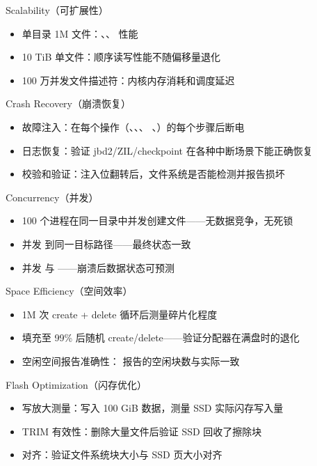 \begin{filesystemlayout}
\begin{rubricbox}{Scalability（可扩展性）}
\begin{itemize}\tightlist
\item 单目录 1M 文件：、、 性能
\item 10 TiB 单文件：顺序读写性能不随偏移量退化
\item 100 万并发文件描述符：内核内存消耗和调度延迟
\end{itemize}
\end{rubricbox}

\begin{rubricbox}{Crash Recovery（崩溃恢复）}
\begin{itemize}\tightlist
\item 故障注入：在每个操作（、、、
      、）的每个步骤后断电
\item 日志恢复：验证 jbd2/ZIL/checkpoint 在各种中断场景下能正确恢复
\item 校验和验证：注入位翻转后，文件系统是否能检测并报告损坏
\end{itemize}
\end{rubricbox}

\begin{rubricbox}{Concurrency（并发）}
\begin{itemize}\tightlist
\item 100 个进程在同一目录中并发创建文件——无数据竞争，无死锁
\item 并发  到同一目标路径——最终状态一致
\item 并发  与 ——崩溃后数据状态可预测
\end{itemize}
\end{rubricbox}

\begin{rubricbox}{Space Efficiency（空间效率）}
\begin{itemize}\tightlist
\item 1M 次 create + delete 循环后测量碎片化程度
\item 填充至 99\% 后随机 create/delete——验证分配器在满盘时的退化
\item 空闲空间报告准确性： 报告的空闲块数与实际一致
\end{itemize}
\end{rubricbox}

\begin{rubricbox}{Flash Optimization（闪存优化）}
\begin{itemize}\tightlist
\item 写放大测量：写入 100 GiB 数据，测量 SSD 实际闪存写入量
\item TRIM 有效性：删除大量文件后验证 SSD 回收了擦除块
\item 对齐：验证文件系统块大小与 SSD 页大小对齐
\end{itemize}
\end{rubricbox}


\end{filesystemlayout}
